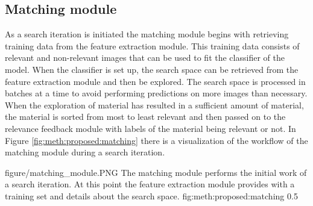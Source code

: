 \subsection{Matching module}
\label{sec:meth:proposed:matching}
As a search iteration is initiated the matching module begins with retrieving training data from the feature extraction module. This training data consists of relevant and non-relevant images that can be used to fit the classifier of the model. When the classifier is set up, the search space can be retrieved from the feature extraction module and then be explored. The search space is processed in batches at a time to avoid performing predictions on more images than necessary. When the exploration of material has resulted in a sufficient amount of material, the material is sorted from most to least relevant and then passed on to the relevance feedback module with labels of the material being relevant or not. 
In Figure \ref{fig:meth:proposed:matching} there is a visualization of the workflow of the matching module during a search iteration. 

\singlefigure
{figure/matching_module.PNG}
{The matching module performs the initial work of a search iteration. At this point the feature extraction module provides with a training set and details about the search space.}
{fig:meth:proposed:matching}
{0.5}





